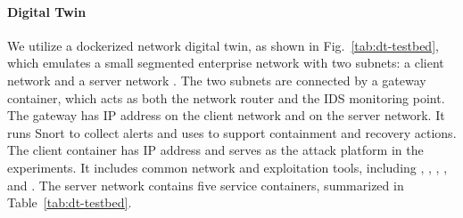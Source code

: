 \documentclass[sigconf]{acmart}
\begin{document}





\paragraph{Digital Twin}
  We utilize a dockerized network digital
  twin, as shown in Fig.~\ref{tab:dt-testbed}, which emulates a small segmented enterprise network with two
  subnets: a client network  and a server network
  . The two subnets are connected by a gateway container, which
  acts as both the network router and the IDS monitoring point. The gateway has
  IP address  on the client network and  on the
  server network. It runs Snort to collect alerts and uses  to
  support containment and recovery actions.
The client container has IP address  and serves as the attack
  platform in the experiments. It includes common network and exploitation tools,
  including , , , , and
  . The server network contains five service containers, summarized
  in Table~\ref{tab:dt-testbed}.
\end{document}
